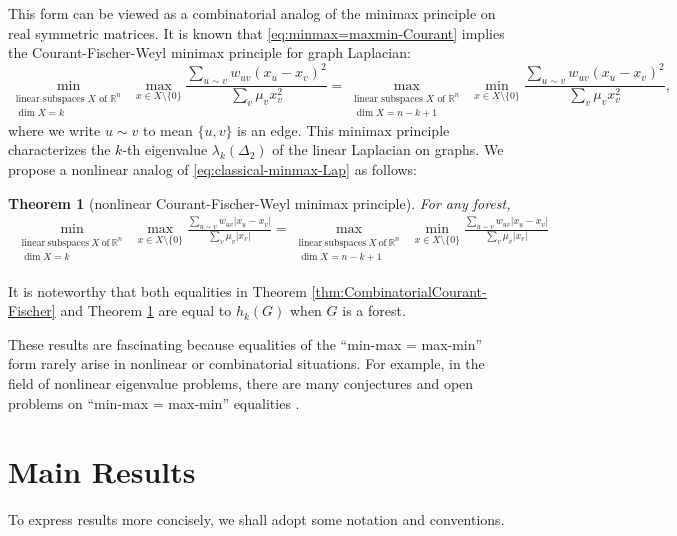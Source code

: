 \documentclass[12pt, reqno]{article}
\newtheorem{theorem}{Theorem}
\begin{document}
This form can be viewed as a combinatorial analog of the minimax principle on real symmetric matrices. 
It is known that \eqref{eq:minmax=maxmin-Courant} implies the Courant-Fischer-Weyl minimax principle for graph Laplacian:
\begin{equation}\label{eq:classical-minmax-Lap}
\min_{\substack{\text{linear subspaces }X\text{ of }\mathbb R^n\\\dim X= k}}~\max_{x\in X\setminus\{0\}} \frac{\sum\limits_{u\sim v}w_{uv}(x_u-x_v)^2}{\sum\limits_v\mu_vx_v^2} = \max_{\substack{\text{linear subspaces }X\text{ of }\mathbb R^n\\\dim X= n-k+1}}~\min_{x\in X\setminus\{0\}} \frac{\sum\limits_{u\sim v}w_{uv}(x_u-x_v)^2}{\sum\limits_v\mu_vx_v^2},
\end{equation}
where we write $u\sim v$ to mean $\{u,v\}$ is an edge. This minimax principle characterizes the $k$-th eigenvalue  $\lambda_k(\Delta_2)$ of the linear Laplacian on graphs. We propose a nonlinear analog of \eqref{eq:classical-minmax-Lap} as follows:
\begin{theorem}[nonlinear Courant-Fischer-Weyl minimax principle]\label{thm:nonlinearCourant-Fischer}
For any forest, 
\begin{align*}\min_{\substack{\mathrm{linear~subspaces~}X\mathrm{~of~}\mathbb R^n\\\dim X= k}}~\max_{x\in X\setminus\{0\}} \frac{\sum\limits_{u\sim v}w_{uv}|x_u-x_v|}{\sum\limits_v\mu_v|x_v|} = \max_{\substack{\mathrm{linear~subspaces~}X\mathrm{~of~}\mathbb R^n\\\dim X= n-k+1}}~\min_{x\in X\setminus\{0\}} \frac{\sum\limits_{u\sim v}w_{uv}|x_u-x_v|}{\sum\limits_v\mu_v|x_v|}
\end{align*}
\end{theorem}

It is noteworthy that both equalities in Theorem \ref{thm:CombinatorialCourant-Fischer} and Theorem \ref{thm:nonlinearCourant-Fischer} are equal to $h_k(G)$ when $G$ is a forest. 

These results are fascinating because equalities of the ``min-max = max-min'' form rarely arise in nonlinear or combinatorial situations. For example, in the field of nonlinear eigenvalue problems, there are many conjectures and open problems on ``min-max = max-min''  equalities \cite{Diening}. 

\section{Main Results}
To express results more concisely, we shall adopt some notation and conventions. 
\end{document}
